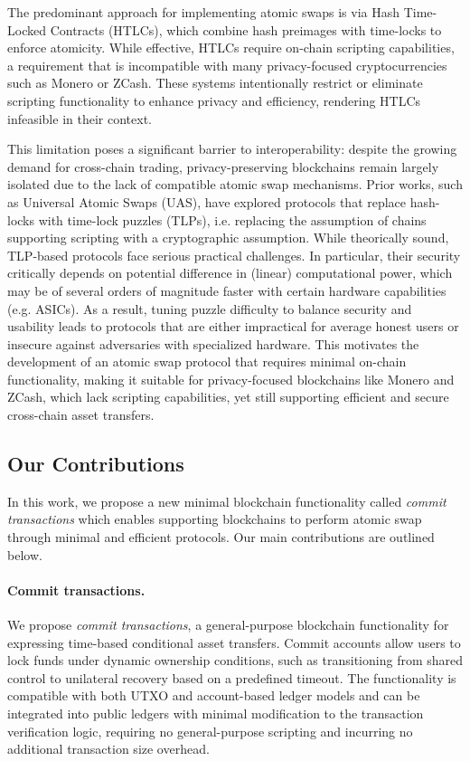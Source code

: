 The predominant approach for implementing atomic swaps is via Hash Time-Locked Contracts (HTLCs), which combine hash preimages with time-locks to enforce atomicity. While effective, HTLCs require on-chain scripting capabilities, a requirement that is incompatible with many privacy-focused cryptocurrencies such as Monero or ZCash. These systems intentionally restrict or eliminate scripting functionality to enhance privacy and efficiency, rendering HTLCs infeasible in their context.

This limitation poses a significant barrier to interoperability: despite the growing demand for cross-chain trading, privacy-preserving blockchains remain largely isolated due to the lack of compatible atomic swap mechanisms. Prior works, such as Universal Atomic Swaps (UAS), have explored protocols that replace hash-locks with time-lock puzzles (TLPs), i.e. replacing the assumption of chains supporting scripting with a cryptographic assumption. While theorically sound, TLP-based protocols face serious practical challenges. In particular, their security critically depends on potential difference in (linear) computational power, which may be of several orders of magnitude faster with certain hardware capabilities (e.g. ASICs). As a result, tuning puzzle difficulty to balance security and usability leads to protocols that are either impractical for average honest users or insecure against adversaries with specialized hardware.
This motivates the development of an atomic swap protocol that requires minimal on-chain functionality, making it suitable for privacy-focused blockchains like Monero and ZCash, which lack scripting capabilities, yet still supporting efficient and secure cross-chain asset transfers.

\subsection{Our Contributions}
In this work, we propose a new minimal blockchain functionality called \emph{commit transactions} which enables supporting blockchains to perform atomic swap through minimal and efficient protocols. Our main contributions are outlined below.
\paragraph*{Commit transactions.} We propose \emph{commit transactions}, a general-purpose blockchain functionality for expressing time-based conditional asset transfers. Commit accounts allow users to lock funds under dynamic ownership conditions, such as transitioning from shared control to unilateral recovery based on a predefined timeout. The functionality is compatible with both UTXO and account-based ledger models and can be integrated into public ledgers with minimal modification to the transaction verification logic, requiring no general-purpose scripting and incurring no additional transaction size overhead.
